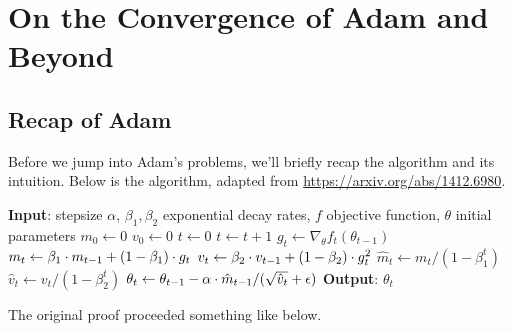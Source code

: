 \documentclass{article}
\begin{document}
\section{On the Convergence of Adam and Beyond}

\subsection{Recap of Adam}

Before we jump into Adam's problems, we'll briefly recap the algorithm and its intuition. Below is the algorithm, adapted from \url{https://arxiv.org/abs/1412.6980}. 

\begin{algorithm}[h!]
\caption{Adam Optimizer}
\begin{algorithmic}[1]
    \STATE \textbf{Input}: stepsize $\alpha$, $\beta_1, \beta_2$ exponential decay rates, $f$ objective function, $\theta$ initial parameters
    \STATE $m_0 \gets 0$
    \STATE $v_0 \gets 0$
    \STATE $t \gets 0$
      \STATE $t \gets t + 1$
      \STATE $g_t \gets \nabla_{\theta}f_t(\theta_{t - 1})$
      \STATE $m_t \gets \beta_1 \cdot m_{t - 1} + \left(1 - \beta_1\right) \cdot g_t$
      \STATE $v_t \gets \beta_2 \cdot v_{t - 1} + \left(1 - \beta_2\right) \cdot g_t^2$
      \STATE $\hat{m}_t \gets m_t/(1 - \beta_1^t)$
      \STATE $\hat{v}_t \gets v_t/(1 - \beta_2^t)$
      \STATE $\theta_t \gets \theta_{t - 1} - \alpha \cdot \hat{m}_{t - 1} / (\sqrt{\hat{v}_t} + \epsilon)$
    \ENDWHILE
    \STATE \textbf{Output}: $\theta_t$
\end{algorithmic}
\end{algorithm}

The original proof proceeded something like below.
\end{document}
